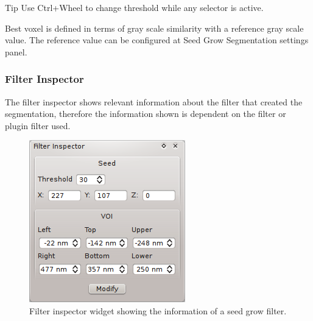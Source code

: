 \vspace{0.3cm}
\begin{bclogo}[couleur = yellow!33, logo= \bcbook]
{Tip} Use Ctrl+Wheel to change threshold while any selector is active. 
\end{bclogo}
\vspace{0.3cm}

Best voxel is defined in terms of gray scale similarity with a
reference gray scale value. The reference value can be configured at Seed Grow
Segmentation settings panel.\\

\subsubsection{Filter Inspector}
The filter inspector shows relevant information about the filter that created the segmentation,
therefore the information shown is dependent on the filter or plugin filter used.

\begin{figure}[H]
\centering
\includegraphics{fig/SeedGrowSegmentationFilterInspector}
\caption{Filter inspector widget showing the information of a seed grow filter.}
\end{figure}

